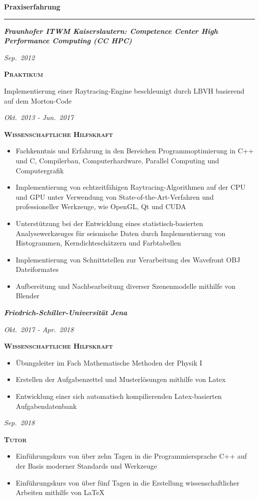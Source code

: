 \documentclass[8pt]{article}
\newcommand{\cvSectionStyle}{%
  \normalfont%
  \Large%
  \color{cvColor}%
  \bfseries%
  \sffamily%
}
\newcommand{\cvSubsectionStyle}{%
  \normalfont%
  \sffamily%
  \itshape%
  \bfseries%
  \color{cvSubsectionColor}%
}
\newcommand{\cvTimeStyle}{%
  \normalfont%
  \sffamily%
  \footnotesize%
  \itshape%
}
\newcommand{\cvQuote}[1]{\guillemotright{}#1\guillemotleft}
\newcommand{\cvSection}[1]{%
  \smallskip%
  {%
    \cvSectionStyle #1%
  }\\[-0.5em]
  \rule{\linewidth}{0.8pt}%
  \par%
  \smallskip%
}
\newcommand{\cvSubsection}[1]{%
  \begin{tcolorbox}[left=0pt, top=0pt, bottom=0pt, right=0pt, boxsep=5pt, arc=5pt, frame code={}, colback=cvBackgroundColor]
    \cvSubsectionStyle #1%
  \end{tcolorbox}
}
\newenvironment{cvItemize}{%
  \begin{itemize}[itemsep=0mm, leftmargin=4mm]
}{%
  \end{itemize}
}
\newenvironment{cvTimeItem}[2]{
  \par
  \begin{minipage}[c]{0.15\linewidth}
    \raggedleft
    \cvTimeStyle #1
  \end{minipage}
  \quad
  \vrule
  \quad
  \begin{minipage}[t]{0.79\linewidth}
    \sffamily\textsc{\color{cvColor} \textbf{#2}}\par
    \normalfont\footnotesize\sffamily\color{cvContentColor}
}{
  \end{minipage}
  \par%
  \vspace{\baselineskip}%
}
\begin{document}
  \cvSection{Praxiserfahrung}
    \cvSubsection{Fraunhofer ITWM Kaiserslautern: Competence Center High Performance Computing (CC HPC)}
      \begin{cvTimeItem}{Sep.~2012}{Praktikum}
        Implementierung einer Raytracing-Engine beschleunigt durch LBVH basierend auf dem Morton-Code
      \end{cvTimeItem}
      \begin{cvTimeItem}{Okt.~2013 - Jun.~2017}{Wissenschaftliche Hilfskraft}
        \begin{cvItemize}
          \item Fachkenntnis und Erfahrung in den Bereichen \cvQuote{Programmoptimierung in C++ und C}, \cvQuote{Compilerbau}, \cvQuote{Computerhardware}, \cvQuote{Parallel Computing} und \cvQuote{Computergrafik}
          \item Implementierung von echtzeitfähigen Raytracing-Algorithmen auf der CPU und GPU unter Verwendung von State-of-the-Art-Verfahren und professioneller Werkzeuge, wie OpenGL, Qt und CUDA
          \item Unterstützung bei der Entwicklung eines statistisch-basierten Analysewerkzeuges für seismische Daten durch Implementierung von Histogrammen, Kerndichteschätzern und Farbtabellen
          \item Implementierung von Schnittstellen zur Verarbeitung des \cvQuote{Wavefront OBJ} Dateiformates
          \item Aufbereitung und Nachbearbeitung diverser Szenenmodelle mithilfe von Blender
        \end{cvItemize}
      \end{cvTimeItem}

    \cvSubsection{Friedrich-Schiller-Universität Jena}
      \begin{cvTimeItem}{Okt.~2017 - Apr.~2018}{Wissenschaftliche Hilfskraft}
        \begin{cvItemize}
          \item Übungsleiter im Fach \cvQuote{Mathematische Methoden der Physik I}
          \item Erstellen der Aufgabenzettel und Musterlösungen mithilfe von Latex
          \item Entwicklung einer sich automatisch kompilierenden Latex-basierten Aufgabendatenbank
        \end{cvItemize}
      \end{cvTimeItem}
      \begin{cvTimeItem}{Sep.~2018}{Tutor}
        \begin{cvItemize}
          \item Einführungskurs von über zehn Tagen in die Programmiersprache C++ auf der Basis moderner Standards und Werkzeuge
          \item Einführungskurs von über fünf Tagen in die Erstellung wissenschaftlicher Arbeiten mithilfe von LaTeX
        \end{cvItemize}
      \end{cvTimeItem}
\end{document}
